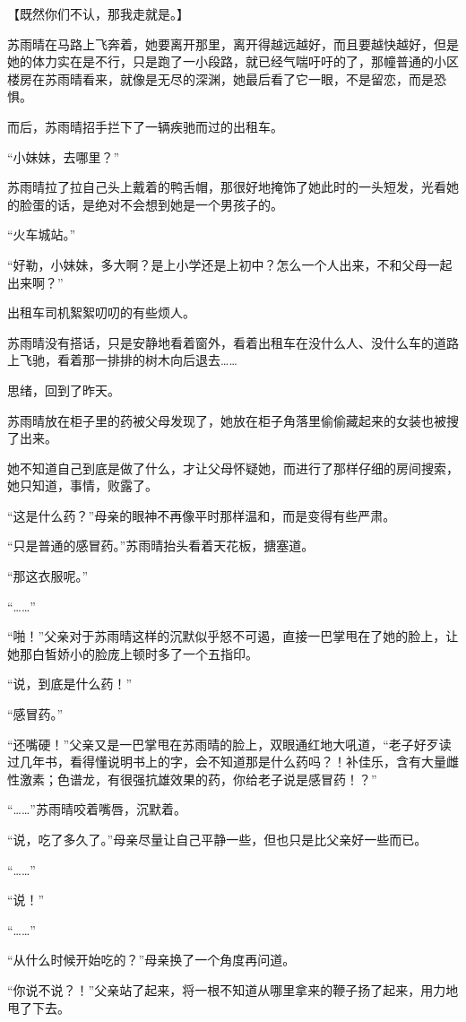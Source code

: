 【既然你们不认，那我走就是。】

苏雨晴在马路上飞奔着，她要离开那里，离开得越远越好，而且要越快越好，但是她的体力实在是不行，只是跑了一小段路，就已经气喘吁吁的了，那幢普通的小区楼房在苏雨晴看来，就像是无尽的深渊，她最后看了它一眼，不是留恋，而是恐惧。

而后，苏雨晴招手拦下了一辆疾驰而过的出租车。

“小妹妹，去哪里？”

苏雨晴拉了拉自己头上戴着的鸭舌帽，那很好地掩饰了她此时的一头短发，光看她的脸蛋的话，是绝对不会想到她是一个男孩子的。

“火车城站。”

“好勒，小妹妹，多大啊？是上小学还是上初中？怎么一个人出来，不和父母一起出来啊？”

出租车司机絮絮叨叨的有些烦人。

苏雨晴没有搭话，只是安静地看着窗外，看着出租车在没什么人、没什么车的道路上飞驰，看着那一排排的树木向后退去……

思绪，回到了昨天。

苏雨晴放在柜子里的药被父母发现了，她放在柜子角落里偷偷藏起来的女装也被搜了出来。

她不知道自己到底是做了什么，才让父母怀疑她，而进行了那样仔细的房间搜索，她只知道，事情，败露了。

“这是什么药？”母亲的眼神不再像平时那样温和，而是变得有些严肃。

“只是普通的感冒药。”苏雨晴抬头看着天花板，搪塞道。

“那这衣服呢。”

“……”

“啪！”父亲对于苏雨晴这样的沉默似乎怒不可遏，直接一巴掌甩在了她的脸上，让她那白皙娇小的脸庞上顿时多了一个五指印。

“说，到底是什么药！”

“感冒药。”

“还嘴硬！”父亲又是一巴掌甩在苏雨晴的脸上，双眼通红地大吼道，“老子好歹读过几年书，看得懂说明书上的字，会不知道那是什么药吗？！补佳乐，含有大量雌性激素；色谱龙，有很强抗雄效果的药，你给老子说是感冒药！？”

“……”苏雨晴咬着嘴唇，沉默着。

“说，吃了多久了。”母亲尽量让自己平静一些，但也只是比父亲好一些而已。

“……”

“说！”

“……”

“从什么时候开始吃的？”母亲换了一个角度再问道。

“你说不说？！”父亲站了起来，将一根不知道从哪里拿来的鞭子扬了起来，用力地甩了下去。

